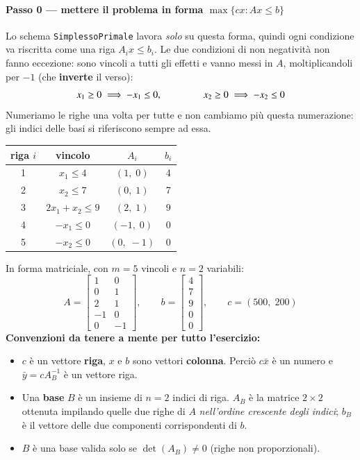 \documentclass[12pt]{extarticle} %
\begin{document}
\paragraph{Passo 0 --- mettere il problema in forma $\max\{cx : Ax \le b\}$}
Lo schema \texttt{SimplessoPrimale} lavora \emph{solo} su questa forma, quindi ogni condizione va riscritta come una riga $A_i x \le b_i$. Le due condizioni di non negatività non fanno eccezione: sono vincoli a tutti gli effetti e vanno messi in $A$, moltiplicandoli per $-1$ (che \textbf{inverte} il verso):
\[
x_1 \ge 0 \;\Longrightarrow\; -x_1 \le 0, \hspace{1.5cm} x_2 \ge 0 \;\Longrightarrow\; -x_2 \le 0
\]
Numeriamo le righe una volta per tutte e non cambiamo più questa numerazione: gli indici delle basi si riferiscono sempre ad essa.
\begin{center}
\begin{tabular}{cccc}
\hline
\textbf{riga $i$} & \textbf{vincolo} & \textbf{$A_i$} & \textbf{$b_i$} \\
\hline
1 & $x_1 \le 4$ & $(1,\;0)$ & 4 \\
2 & $x_2 \le 7$ & $(0,\;1)$ & 7 \\
3 & $2x_1 + x_2 \le 9$ & $(2,\;1)$ & 9 \\
4 & $-x_1 \le 0$ & $(-1,\;0)$ & 0 \\
5 & $-x_2 \le 0$ & $(0,\;-1)$ & 0 \\
\hline
\end{tabular}
\end{center}
In forma matriciale, con $m=5$ vincoli e $n=2$ variabili:
\[
A = \begin{bmatrix} 1 & 0\\ 0 & 1\\ 2 & 1\\ -1 & 0\\ 0 & -1\end{bmatrix},
\qquad b = \begin{bmatrix} 4\\ 7\\ 9\\ 0\\ 0\end{bmatrix},
\qquad c = (500,\;200)
\]
\textbf{Convenzioni da tenere a mente per tutto l'esercizio:}
\begin{itemize}
    \item $c$ è un vettore \textbf{riga}, $x$ e $b$ sono vettori \textbf{colonna}. Perciò $c\bar{x}$ è un numero e $\bar{y} = cA_B^{-1}$ è un vettore riga.
    \item Una \textbf{base} $B$ è un insieme di $n = 2$ indici di riga. $A_B$ è la matrice $2\times2$ ottenuta impilando quelle due righe di $A$ \emph{nell'ordine crescente degli indici}; $b_B$ è il vettore delle due componenti corrispondenti di $b$.
    \item $B$ è una base valida solo se $\det(A_B) \ne 0$ (righe non proporzionali).
\end{itemize}
\end{document}
